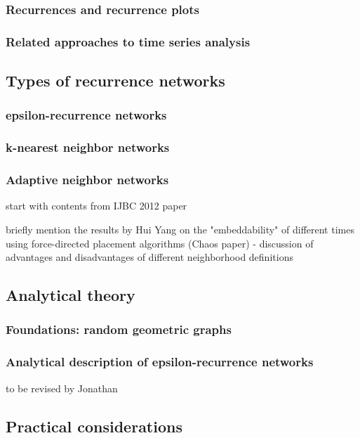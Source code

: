 		\subsubsection{Recurrences and recurrence plots}
		\subsubsection{Related approaches to time series analysis}

	\subsection{Types of recurrence networks}
		\subsubsection{epsilon-recurrence networks}
		\subsubsection{k-nearest neighbor networks}
		\subsubsection{Adaptive neighbor networks}

start with contents from IJBC 2012 paper

briefly mention the results by Hui Yang on the "embeddability" of different
times using force-directed placement algorithms (Chaos paper) - discussion of
advantages and disadvantages of different neighborhood definitions  

	\subsection{Analytical theory}
		\subsubsection{Foundations: random geometric graphs}
		\subsubsection{Analytical description of epsilon-recurrence networks}

to be revised by Jonathan

	\subsection{Practical considerations}
